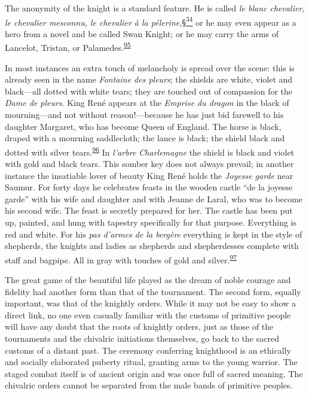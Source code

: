 The anonymity of the knight is a standard feature. He is called \emph{le
blanc chevalier, le chevalier mesconnu, le chevalier à la
pélerine},\protect\hypertarget{10_Chapter_Three__THE_HEROIC_DREAM.xhtmlux5cux23id_2529}{\protect\hyperlink{23_NOTES.xhtmlux5cux23id_2530}{§\textsuperscript{34}}}
or he may even appear as a hero
\protect\hypertarget{10_Chapter_Three__THE_HEROIC_DREAM.xhtmlux5cux23page_91}{}{}from
a novel and be called Swan Knight; or he may carry the arms of Lancelot,
Tristan, or
Palamedes.\textsuperscript{\protect\hypertarget{10_Chapter_Three__THE_HEROIC_DREAM.xhtmlux5cux23id_1745}{\protect\hyperlink{23_NOTES.xhtmlux5cux23id_1746}{95}}}

In most instances an extra touch of melancholy is spread over the scene:
this is already seen in the name \emph{Fontaine des pleurs}; the shields
are white, violet and black---all dotted with white tears; they are
touched out of compassion for the \emph{Dame de pleurs}. King René
appears at the \emph{Emprise du dragon} in the black of mourning---and
not without reason!---because he has just bid farewell to his daughter
Margaret, who has become Queen of England. The horse is black, draped
with a mourning saddlecloth; the lance is black; the shield black and
dotted with silver
tears.\textsuperscript{\protect\hypertarget{10_Chapter_Three__THE_HEROIC_DREAM.xhtmlux5cux23id_1743}{\protect\hyperlink{23_NOTES.xhtmlux5cux23id_1744}{96}}}
In \emph{l'arbre Charlemagne} the shield is black and violet with gold
and black tears. This somber key does not always prevail; in another
instance the insatiable lover of beauty King René holds the
\emph{Joyesse garde} near Saumur. For forty days he celebrates feasts in
the wooden castle ``de la joyesse garde'' with his wife and daughter and
with Jeanne de Laral, who was to become his second wife. The feast is
secretly prepared for her. The castle has been put up, painted, and hung
with tapestry specifically for that purpose. Everything is red and
white. For his \emph{pas d'armes de la bergère} everything is kept in
the style of shepherds, the knights and ladies as shepherds and
shepherdesses complete with staff and bagpipe. All in gray with touches
of gold and
silver.\textsuperscript{\protect\hypertarget{10_Chapter_Three__THE_HEROIC_DREAM.xhtmlux5cux23id_1741}{\protect\hyperlink{23_NOTES.xhtmlux5cux23id_1742}{97}}}

The great game of the beautiful life played as the dream of noble
courage and fidelity had another form than that of the tournament. The
second form, equally important, was that of the knightly orders. While
it may not be easy to show a direct link, no one even casually familiar
with the customs of primitive people will have any doubt that the roots
of knightly orders, just as those of the tournaments and the chivalric
initiations themselves, go back to the sacred customs of a distant past.
The ceremony conferring knighthood is an ethically and socially
elaborated puberty ritual, granting arms to the young warrior. The
staged combat itself is of ancient origin and was once full of sacred
meaning. The chivalric orders cannot be separated from the male bands of
primitive peoples.


